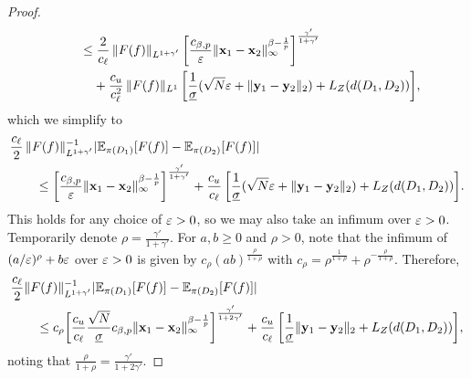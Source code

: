 \documentclass[12pt, twoside]{report}
\begin{document}
\begin{proof}
\begin{align}
        &\qquad
            \le
            \frac{2}{c_\ell}
            \,\norm{F(f)}_{L^{1 + \gamma'}}
            \,\sbrac*{
                \frac{c_{\beta, p}}{\e} \norm{\vx_1 - \vx_2}_\infty^{\beta - \frac{1}{p}}
            }^{\frac{\gamma'}{1 + \gamma'}}
            \nonumber \\
        &\qquad\phantom{\le}\;
            + \frac{c_u}{c_\ell^2}\,\norm{F(f)}_{L^1}
            \,\sbrac*{
                \frac{1}{\underline{\sigma}}(
                    \sqrt{N}\e
                    + \norm{\vy_1 - \vy_2}_2
                )
                + L_Z(d(D_1, D_2))
            },
    \end{align}
    which we simplify to
    \begin{align}
        &\frac{c_\ell}{2}\, \norm{F(f)}^{-1}_{L^{1 + \gamma'}}\abs{\E_{\pi(D_1)}[F(f)] - \E_{\pi(D_2)}[F(f)]} \\
        &\qquad
            \le
            \sbrac*{
                \frac{c_{\beta, p}}{\e} \norm{\vx_1 - \vx_2}_\infty^{\beta - \frac{1}{p}}
            }^{\frac{\gamma'}{1 + \gamma'}}
            + \frac{c_u}{c_\ell}
            \,\sbrac*{
                \frac{1}{\underline{\sigma}}(
                    \sqrt{N}\e
                    + \norm{\vy_1 - \vy_2}_2
                )
                + L_Z(d(D_1, D_2))
            }. \nonumber
    \end{align}
    This holds for any choice of $\varepsilon > 0$,
    so we may also take an infimum over $\varepsilon > 0$.
    Temporarily denote $\rho = \frac{\gamma'}{1 + \gamma'}$.
    For $a, b \ge 0$ and $\rho > 0$, note that the infimum of $(a/\varepsilon)^\rho + b \varepsilon$ over $\varepsilon > 0$ is given by
    $c_\rho (ab)^{\frac{\rho}{1+\rho}}$ with $c_\rho = \rho^{\frac1{1+\rho}} + \rho^{-\frac{\rho}{1+\rho}}$.
    Therefore,
    \begin{align}
        &\frac{c_\ell}{2} \norm{F(f)}^{-1}_{L^{1 + \gamma'}}\abs{\E_{\pi(D_1)}[F(f)] - \E_{\pi(D_2)}[F(f)]} \\
        &\qquad
            \le
            c_\rho \sbrac*{
                \frac{c_u}{c_\ell}
                \frac{\smash{\sqrt{N}}}{\underline{\sigma}}
                c_{\beta, p} \norm{\vx_1 - \vx_2}_\infty^{\beta - \frac{1}{p}}
            }^{\frac{\gamma'}{1 + 2 \gamma'}}
            + \frac{c_u}{c_\ell}
            \,\sbrac*{
                \frac{1}{\underline{\sigma}} \norm{\vy_1 - \vy_2}_2
                + L_Z(d(D_1, D_2))
            }, \nonumber
    \end{align}
    noting that $\frac{\rho}{1+ \rho}=\frac{\gamma'}{1+2\gamma'}$.
\end{proof}
\end{document}
